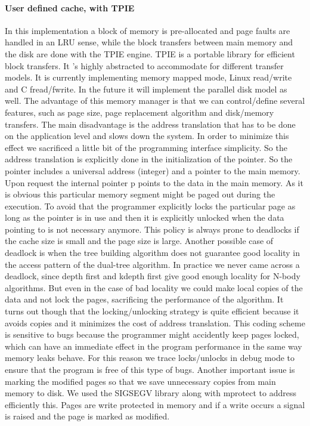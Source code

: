 \documentclass[12pt,letterpaper,doublespaced,ETD,dvips,proposal]{gtthesis}
\begin{document}
\begin{Body}
\paragraph{User defined cache, with TPIE} In this implementation a block of
memory is pre-allocated and page faults are handled in an LRU sense,
while the block transfers between main memory and the disk are done
with the TPIE engine. TPIE is a portable library for efficient block
transfers. It 's highly abstracted to accommodate for different
transfer models. It is currently implementing memory mapped mode,
Linux read/write and C fread/fwrite. In the future it will implement
the parallel disk model as well. The advantage of this memory
manager is that we can control/define several features, such as page
size, page replacement algorithm and disk/memory transfers. The main
disadvantage is the address translation that has to be done on the
application level and slows down the system. In order to minimize
this effect we sacrificed a little bit of the programming interface
simplicity. So the address translation is explicitly done in the
initialization of the pointer. So the pointer includes a universal
address (integer) and a pointer to the main memory. Upon request the
internal pointer p points to the data in the main memory. As it is
obvious this particular memory segment might be paged out during the
execution. To avoid that the programmer explicitly locks the
particular page as long as the pointer is in use and then it is
explicitly unlocked when the data pointing to is not necessary
anymore. This policy is always prone to deadlocks if the cache
size is small and the page size is large. Another possible case of
deadlock is when the tree building algorithm does not guarantee good
locality in the access pattern of the dual-tree algorithm. In
practice we never came across a deadlock, since depth first and
kdepth first give good enough locality for N-body algorithms. But
even in the case of bad locality we could make local copies of the
data and not lock the pages, sacrificing the performance of the
algorithm. It turns out though that the locking/unlocking strategy
is quite efficient because it avoids copies and it minimizes the
cost of address translation. This coding scheme is sensitive to bugs
because the programmer might accidently keep pages locked, which can
have an immediate effect in the program performance in the same way
memory leaks behave. For this reason we trace locks/unlocks in debug
mode to ensure that the program is free of this type of bugs.
Another important issue is marking the modified pages so that we
save unnecessary copies from main memory to disk. We used the
SIGSEGV library along with mprotect to address efficiently this.
Pages are write protected in memory and if a write occurs a signal
is raised and the page is marked as modified.


\end{Body}
\end{document}
